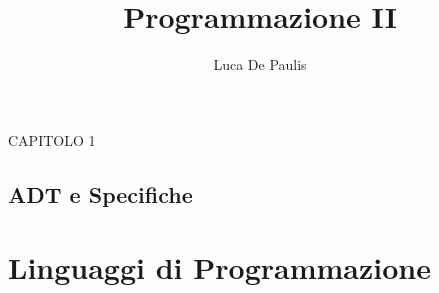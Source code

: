 \documentclass[italian,oneside,headinclude,10pt]{scrbook}
\begin{document}
\author{Luca De Paulis}
\title{Programmazione II}
\maketitle

\tableofcontents

CAPITOLO 1




\chapter{ADT e Specifiche}


\part{Linguaggi di Programmazione}

\end{document}
